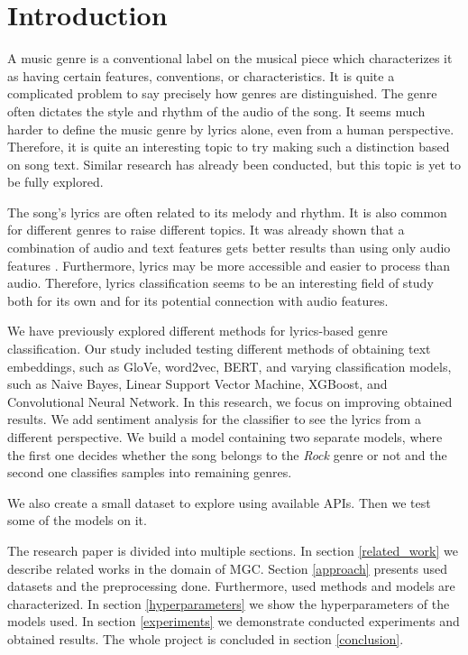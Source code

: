 \section{Introduction}
A music genre is a conventional label on the musical piece which characterizes it as having certain features, conventions, or characteristics. It is quite a complicated problem to say precisely how genres are distinguished. The genre often dictates the style and rhythm of the audio of the song. It seems much harder to define the music genre by lyrics alone, even from a human perspective. Therefore, it is quite an interesting topic to try making such a distinction based on song text. Similar research has already been conducted, but this topic is yet to be fully explored.

The song's lyrics are often related to its melody and rhythm. It is also common for different genres to raise different topics. It was already shown that a combination of audio and text features gets better results than using only audio features \cite{mayer2011Ref}. Furthermore, lyrics may be more accessible and easier to process than audio. Therefore, lyrics classification seems to be an interesting field of study both for its own and for its potential connection with audio features.

We have previously explored different methods for lyrics-based genre classification. Our study included testing different methods of obtaining text embeddings, such as GloVe, word2vec, BERT, and varying classification models, such as Naive Bayes, Linear Support Vector Machine, XGBoost, and Convolutional Neural Network. In this research, we focus on improving obtained results. We add sentiment analysis for the classifier to see the lyrics from a different perspective. We build a model containing two separate models, where the first one decides whether the song belongs to the \textit{Rock} genre or not and the second one classifies samples into remaining genres. 

We also create a small dataset to explore using available APIs. Then we test some of the models on it.

The research paper is divided into multiple sections. In section \ref{related_work} we describe related works in the domain of MGC. Section \ref{approach} presents used datasets and the preprocessing done. Furthermore, used methods and models are characterized. In section \ref{hyperparameters} we show the hyperparameters of the models used. In section \ref{experiments} we demonstrate conducted experiments and obtained results. The whole project is concluded in section \ref{conclusion}.
